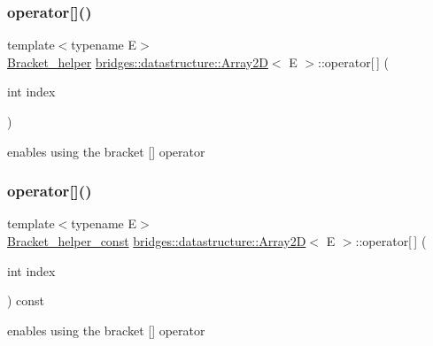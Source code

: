 \subsubsection{\texorpdfstring{operator[]()}{operator[]()}\hspace{0.1cm}{\footnotesize\ttfamily [1/2]}}
{\footnotesize\ttfamily template$<$typename E$>$ \\
\mbox{\hyperlink{structbridges_1_1datastructure_1_1_array2_d_1_1_bracket__helper}{Bracket\+\_\+helper}} \mbox{\hyperlink{classbridges_1_1datastructure_1_1_array2_d}{bridges\+::datastructure\+::\+Array2D}}$<$ E $>$\+::operator\mbox{[}$\,$\mbox{]} (\begin{DoxyParamCaption}\item[{int}]{index }\end{DoxyParamCaption})\hspace{0.3cm}{\ttfamily [inline]}}



enables using the bracket \mbox{[}\mbox{]} operator 

\mbox{\label{classbridges_1_1datastructure_1_1_array2_d_a427adc67a85ec12e765199448ac82ec2}} 
\subsubsection{\texorpdfstring{operator[]()}{operator[]()}\hspace{0.1cm}{\footnotesize\ttfamily [2/2]}}
{\footnotesize\ttfamily template$<$typename E$>$ \\
\mbox{\hyperlink{structbridges_1_1datastructure_1_1_array2_d_1_1_bracket__helper__const}{Bracket\+\_\+helper\+\_\+const}} \mbox{\hyperlink{classbridges_1_1datastructure_1_1_array2_d}{bridges\+::datastructure\+::\+Array2D}}$<$ E $>$\+::operator\mbox{[}$\,$\mbox{]} (\begin{DoxyParamCaption}\item[{int}]{index }\end{DoxyParamCaption}) const\hspace{0.3cm}{\ttfamily [inline]}}



enables using the bracket \mbox{[}\mbox{]} operator 


